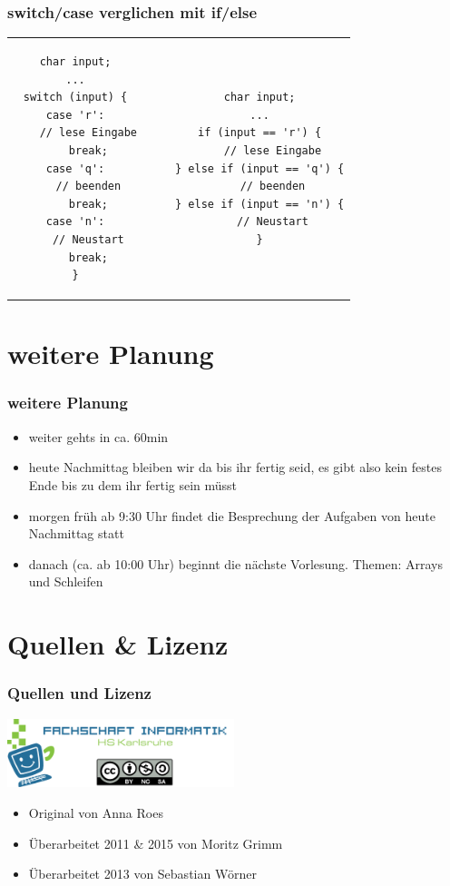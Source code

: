 \documentclass[final]{beamer}
\begin{document}
\begin{frame}[containsverbatim]
\frametitle{switch/case verglichen mit if/else}
	\begin{tabular}{c c c c}
	\begin{lstlisting}
char input;
...
switch (input) {
case 'r':
	// lese Eingabe
	break;
case 'q':
	// beenden
	break;
case 'n':
	// Neustart
	break;
}
	\end{lstlisting}

& & &

	\begin{lstlisting}
char input;
...
if (input == 'r') {
	// lese Eingabe
} else if (input == 'q') {
	// beenden
} else if (input == 'n') {
	// Neustart
}
	\end{lstlisting}\\
	\end{tabular}
\end{frame}

\section{weitere Planung}
\begin{frame}
\frametitle{weitere Planung}
	\begin{itemize}
		\item{weiter gehts in ca. 60min}
		\item{heute Nachmittag bleiben wir da bis ihr fertig seid, es gibt also kein festes Ende bis zu dem ihr fertig sein müsst}
		\item{morgen früh ab 9:30 Uhr findet die Besprechung der Aufgaben von heute Nachmittag statt}
		\item{danach (ca. ab 10:00 Uhr) beginnt die nächste Vorlesung. Themen: Arrays und Schleifen}
	\end{itemize}
\end{frame}

\section{Quellen \& Lizenz}
\begin{frame}
	\frametitle{Quellen und Lizenz}
	\begin{center}
		\includegraphics[width=250px]{gfx/fsi}
	\end{center}
	\begin{itemize}
		\item{Original von Anna Roes}
		\item{Überarbeitet 2011 \& 2015 von Moritz Grimm}
		\item{Überarbeitet 2013 von Sebastian Wörner}
	\end{itemize}
\end{frame}
\end{document}

